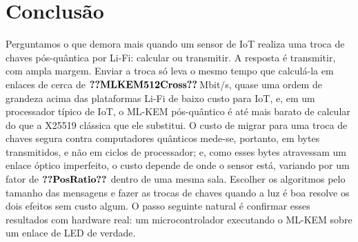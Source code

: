 \documentclass[12pt]{article}
\begin{document}
\section{Conclusão}\label{sec:conclusion}
Perguntamos o que demora mais quando um sensor de IoT realiza uma troca de
chaves pós-quântica por Li-Fi: calcular ou transmitir. A resposta é
transmitir, com ampla margem. Enviar a troca só leva o mesmo tempo que
calculá-la em enlaces de cerca de $\val{MLKEM512Cross}$\,Mbit/s, quase uma
ordem de grandeza acima das plataformas Li-Fi de baixo custo para IoT, e, em um
processador típico de IoT, o ML-KEM pós-quântico é até mais barato de calcular
do que a X25519 clássica que ele substitui. O custo de migrar para uma troca de
chaves segura contra computadores quânticos mede-se, portanto, em bytes
transmitidos, e não em ciclos de processador; e, como esses bytes atravessam um
enlace óptico imperfeito, o custo depende de onde o sensor está, variando por
um fator de $\val{PosRatio}$ dentro de uma mesma sala. Escolher os algoritmos
pelo tamanho das mensagens e fazer as trocas de chaves quando a luz é boa
resolve os dois efeitos sem custo algum. O passo seguinte natural é confirmar
esses resultados com hardware real: um microcontrolador executando o ML-KEM
sobre um enlace de LED de verdade.



\end{document}

